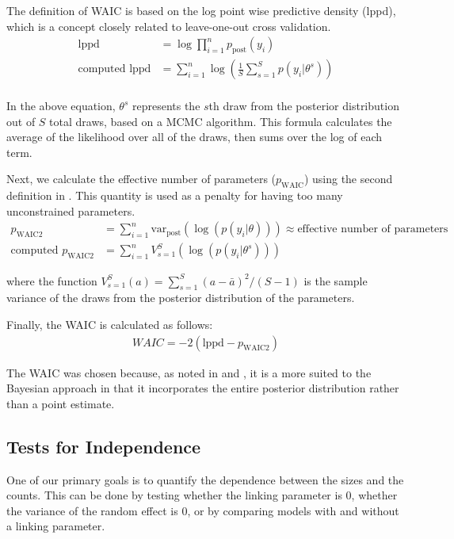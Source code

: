 \documentclass[10pt,letterpaper]{article}
\begin{document}
The definition of WAIC is based on the log point wise predictive density
(lppd), which is a concept closely related to leave-one-out cross
validation. \begin{align*}
\text{lppd} &= \log\prod_{i=1}^np_{\text{post}}(y_i)\\
\text{computed lppd} &= \sum_{i=1}^n\log\left(\frac{1}{S}\sum_{s = 1}^Sp(y_i|\theta^s)\right)\\
\end{align*}

In the above equation, \(\theta^s\) represents the \(s\)th draw from the
posterior distribution out of $S$ total draws, based on a MCMC algorithm.
This formula calculates the average of the likelihood over all of the
draws, then sums over the log of each term.

Next, we calculate the effective number of parameters
(\(p_\text{WAIC}\)) using the second definition in
\cite{gelmanUnderstandingPredictiveInformation2014a}. This quantity is
used as a penalty for having too many unconstrained parameters.
\begin{align*}
p_\text{WAIC2} &= \sum_{i=1}^n\text{var}_\text{post}(\log(p(y_i|\theta)))\approx \text{effective number of parameters}\\
\text{computed }p_{\text{WAIC2}} &= \sum_{i=1}^nV_{s=1}^S(\log(p(y_i|\theta^s)))
\end{align*}

\noindent where the function \(V_{s=1}^S(a) = \sum_{s=1}^S(a - \bar a)^2/(S-1)\)
is the sample variance of the draws from the posterior distribution of
the parameters.

Finally, the WAIC is calculated as follows: \begin{align}
WAIC = -2(\text{lppd} - p_\text{WAIC2})
\end{align}

The WAIC was chosen because, as noted in
\cite{gelmanUnderstandingPredictiveInformation2014a} and \cite{loo2017}, it is a more
suited to the Bayesian approach in that it incorporates the entire
posterior distribution rather than a point estimate.

\hypertarget{tests-for-independence}{%
\subsection{Tests for Independence}\label{tests-for-independence}}

One of our primary goals is to quantify the dependence between the sizes
and the counts. This can be done by testing whether the linking
parameter is 0, whether the variance of the random effect is 0, or by
comparing models with and without a linking parameter.
\end{document}
